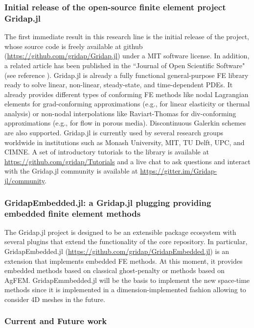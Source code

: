 \documentclass{article}
\begin{document}
\subsubsection{Initial release of the open-source finite element project Gridap.jl} 

The first immediate result in this research line is the initial release of the project, whose source code is freely available at github (\url{https://github.com/gridap/Gridap.jl}) under a MIT software license. In addition, a related article  {has been published in the ``Journal of Open Scientific Software"} (see reference \cite{badia_2020b}). Gridap.jl is already a fully functional general-purpose FE library ready to solve linear, non-linear, steady-state, and time-dependent PDEs. It already provides different types of conforming FE methods like nodal Lagrangian elements for grad-conforming approximations (e.g., for linear elasticity or thermal analysis) or non-nodal interpolations like Raviart-Thomas for div-conforming approximations (e.g., for flow in porous media). Discontinuous Galerkin schemes are also supported. Gridap.jl is currently used by several research groups worldwide in institutions such as Monash University, MIT, TU Delft, UPC, and CIMNE. A set of introductory tutorials to the library is available at \url{https://github.com/gridap/Tutorials} and a live chat to ask questions and interact with the Gridap.jl community is available at \url{https://gitter.im/Gridap-jl/community}.

\subsubsection{GridapEmbedded.jl: a Gridap.jl plugging providing embedded finite element methods}

The Gridap.jl project is designed to be an extensible package ecosystem with several plugins that extend the functionality of the core repository. In particular, GridapEmbedded.jl (\url{https://github.com/gridap/GridapEmbedded.jl}) is an extension that implements embedded FE methods. At this moment, it provides embedded methods based on classical ghost-penalty  or methods based on AgFEM. GridapEmmbedded.jl will be the basis to implement the new space-time methods since it is implemented in a dimension-implemented fashion allowing to consider 4D meshes in the future. 

\subsubsection{Current and Future work}
 
\end{document}
